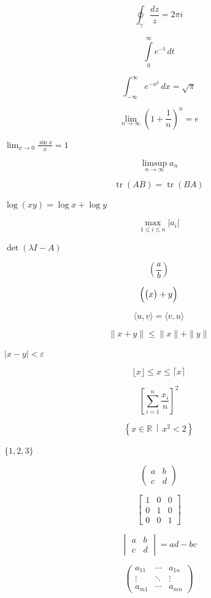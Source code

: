 \documentclass{article}
\begin{document}
\newpage
\[
\oint_{\gamma} \frac{dz}{z} = 2\pi i
\]
\par
\newpage
\[
\int\limits_{0}^{\infty} e^{-t}\,dt
\]
\par
\newpage
\[
\int_{-\infty}^{\infty} e^{-x^2}\,dx = \sqrt{\pi}
\]
\par
\newpage
\[
\lim_{n \to \infty} \left(1 + \frac{1}{n}\right)^{n} = e
\]
\par
\newpage
$
\lim_{x \to 0} \frac{\sin x}{x} = 1
$
\par
\newpage
\[
\limsup_{n \to \infty} a_n
\]
\par
\newpage
\[
\operatorname{tr}(AB) = \operatorname{tr}(BA)
\]
\par
\newpage
$
\log(xy) = \log x + \log y
$
\par
\newpage
\[
\max_{1 \le i \le n} |a_i|
\]
\par
\newpage
$
\det(\lambda I - A)
$
\par
\newpage
\[
\left( \frac{a}{b} \right)
\]
\par
\newpage
\[
\Bigl( \bigl( x \bigr) + y \Bigr)
\]
\par
\newpage
\[
\langle u, v \rangle = \langle v, u \rangle
\]
\par
\newpage
\[
\| x + y \| \le \| x \| + \| y \|
\]
\par
\newpage
$
|x - y| < \varepsilon
$
\par
\newpage
\[
\lfloor x \rfloor \le x \le \lceil x \rceil
\]
\par
\newpage
\[
\left[ \sum_{i=1}^{n} \frac{x_i}{n} \right]^{2}
\]
\par
\newpage
\[
\left\{ x \in \mathbb{R} \,\middle|\, x^2 < 2 \right\}
\]
\par
\newpage
$
\{1, 2, 3\}
$
\par
\newpage
\[
\begin{pmatrix} a & b \\ c & d \end{pmatrix}
\]
\par
\newpage
\[
\begin{bmatrix} 1 & 0 & 0 \\ 0 & 1 & 0 \\ 0 & 0 & 1 \end{bmatrix}
\]
\par
\newpage
\[
\begin{vmatrix} a & b \\ c & d \end{vmatrix} = ad - bc
\]
\par
\newpage
\[
\begin{pmatrix} a_{11} & \cdots & a_{1n} \\ \vdots & \ddots & \vdots \\ a_{m1} & \cdots & a_{mn} \end{pmatrix}
\]
\end{document}
